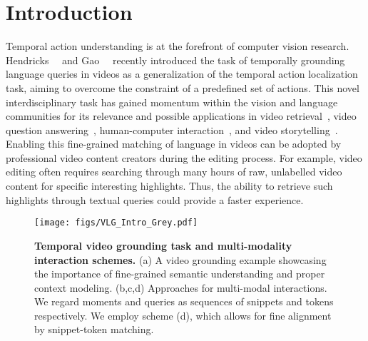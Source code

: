 \documentclass[10pt,twocolumn,letterpaper]{article}
\begin{document}
\section{Introduction}\label{sec: intro}
Temporal action understanding is at the forefront of computer vision research. 
Hendricks~\etal~\cite{Hendricks_2017_ICCV} and Gao~\etal~\cite{Gao_2017_ICCV} recently introduced the task of temporally grounding language queries in videos as a generalization of the temporal action localization task, aiming to overcome the constraint of a predefined set of actions. 
This novel interdisciplinary task has gained momentum within the vision and language communities for its relevance and possible applications in video retrieval~\cite{dong2019dual, Shao_2018_ECCV, yu2018joint}, video question answering~\cite{huang2020location,lei2018tvqa}, human-computer interaction~\cite{zhu2020vision}, and video storytelling~\cite{gella2018dataset}. 
Enabling this fine-grained matching of language in videos can be adopted by professional video content creators during the editing process. For example, video editing often requires searching through many hours of raw, unlabelled video content for specific interesting highlights. Thus, the ability to retrieve such highlights through textual queries could provide a faster experience. 

\begin{figure}[t]
    \centering
    \texttt{[image: figs/VLG\_Intro\_Grey.pdf]}
\caption{\textbf{Temporal video grounding task and multi-modality interaction schemes.} (a) A video grounding example showcasing the importance of fine-grained semantic understanding and  proper context modeling. 
    (b,c,d) Approaches for multi-modal interactions. We regard moments and queries as sequences of snippets and tokens respectively.
    We employ scheme (d), which allows for fine alignment by snippet-token matching. }
    \label{fig:intro}
    \vspace{-0.3cm}
\end{figure}
\end{document}
